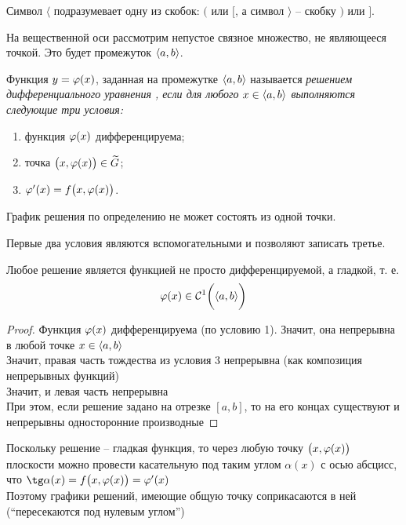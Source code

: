 \begin{notation}
	Символ $ \langle $ подразумевает одну из скобок: $ ( $ или $ [ $, а символ $ \rangle $ -- скобку $ ) $ или $ ] $.
\end{notation}

На вещественной оси рассмотрим непустое связное множество, не являющееся точкой. Это будет промежуток $ \braket{a, b} $.

\begin{definition}
    Функция $ y = \vphi(x) $, заданная на промежутке $ \braket{a, b} $ называется \it{решением дифференциального уравнения} , если для любого $ x \in \braket{a, b} $ выполняются следующие три условия:
    \begin{enumerate}
        \item функция $ \vphi(x) $ дифференцируема;
        \item точка $ \big( x, \vphi(x) \big) \in \vawe{G} $;
        \item $ \vphi'(x) = f\big( x, \vphi(x) \big) $.
    \end{enumerate}
\end{definition}

\begin{remark}
	График решения по определению не может состоять из одной точки.
\end{remark}

\begin{remark}
	Первые два условия являются вспомогательными и позволяют записать третье.
\end{remark}

\begin{remark}
    Любое решение является функцией не просто дифференцируемой, а гладкой, т. е.
    $$ \vphi(x) \in \Cont[1]{\braket{a, b}} $$
\end{remark}

\begin{proof}
    Функция $ \vphi(x) $ дифференцируема (по условию 1). Значит, она непрерывна в любой точке $ x \in \braket{a, b} $ \\
    Значит, правая часть тождества из условия 3 непрерывна (как композиция непрерывных функций) \\
    Значит, и левая часть непрерывна \\
    При этом, если решение задано на отрезке $ [a, b] $, то на его концах существуют и непрерывны односторонние производные
\end{proof}

\begin{remark}
	Поскольку решение -- гладкая функция, то через любую точку $ \big( x, \vphi(x) \big) $ плоскости можно провести касательную под таким углом $ \alpha(x) $ с осью абсцисс, что $ \tg \alpha(x) = f \big(x, \vphi(x) \big) = \vphi'(x) $ \\
    Поэтому графики решений, имеющие общую точку соприкасаются в ней (``пересекаются под нулевым углом'')
\end{remark}

